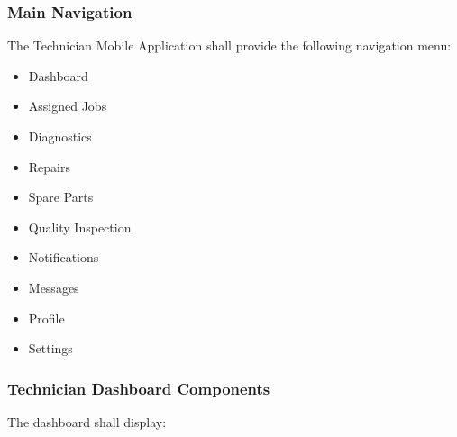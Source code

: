 
\subsubsection*{Main Navigation}

The Technician Mobile Application shall provide the following navigation
menu:

\begin{itemize}

\item Dashboard

\item Assigned Jobs

\item Diagnostics

\item Repairs

\item Spare Parts

\item Quality Inspection

\item Notifications

\item Messages

\item Profile

\item Settings

\end{itemize}


\subsubsection*{Technician Dashboard Components}

The dashboard shall display:


